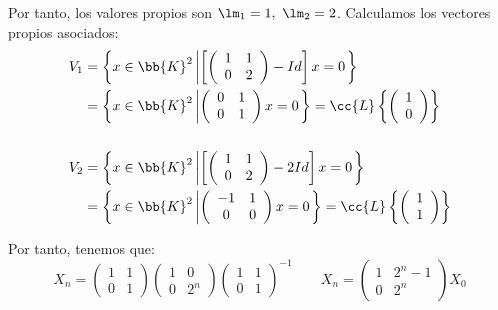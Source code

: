 \begin{ejemplo}
    Por tanto, los valores propios son $\lm_1=1,~\lm_2=2$. Calculamos los vectores propios asociados:
    \begin{align*}
        V_{1} &= \left\{x\in \bb{K}^2 \left|\left[\left(
        \begin{array}{cc}
            1 & 1\\
            0 & 2
        \end{array}
        \right)-Id\right]x = 0\right.\right\} \\
        &= \left\{x\in \bb{K}^2 \left|\left(
        \begin{array}{cc}
            0 & 1\\
            0 & 1
        \end{array}
        \right)x = 0\right.\right\}
        = \cc{L}\left\{\left(
        \begin{array}{c}
            1\\0
        \end{array}
        \right)\right\} \\ \\
        V_{2} &= \left\{x\in \bb{K}^2 \left|\left[\left(
        \begin{array}{cc}
            1 & 1\\
            0 & 2
        \end{array}
        \right)-2Id\right]x = 0\right.\right\} \\
        &= \left\{x\in \bb{K}^2 \left|\left(
        \begin{array}{cc}
            -1 & 1\\
            0 & 0
        \end{array}
        \right)x = 0\right.\right\}
        = \cc{L}\left\{\left(
        \begin{array}{c}
            1\\1
        \end{array}
        \right)\right\}
    \end{align*}

    Por tanto, tenemos que:
    \begin{equation*}
        X_{n} = \left(
        \begin{array}{cc}
            1 & 1\\
            0 & 1
        \end{array}
        \right)
        \left(
        \begin{array}{cc}
            1 & 0\\
            0 & 2^n
        \end{array}
        \right)
        \left(
        \begin{array}{cc}
            1 & 1\\
            0 & 1
        \end{array}
        \right)^{-1}\qquad
        X_n = \left(\begin{matrix}
            1 & 2^n-1 \\
            0 & 2^n
        \end{matrix}\right)X_0
    \end{equation*}
\end{ejemplo}


